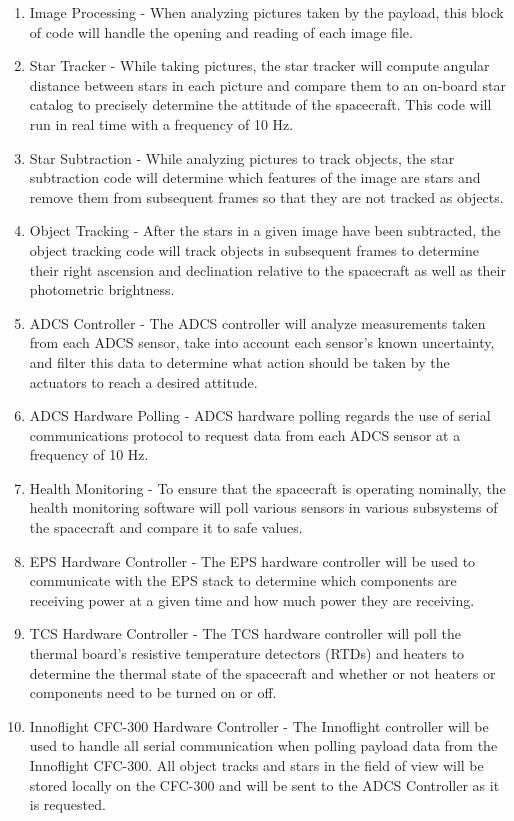 \documentclass{article}
\begin{document}
\begin{enumerate}
\item Image Processing - When analyzing pictures taken by the payload, this block of code will handle the opening and reading of each image file.
\item Star Tracker - While taking pictures, the star tracker will compute angular distance between stars in each picture and compare them to an on-board star catalog to precisely determine the attitude of the spacecraft. This code will run in real time with a frequency of 10 Hz.
\item Star Subtraction - While analyzing pictures to track objects, the star subtraction code will determine which features of the image are stars and remove them from subsequent frames so that they are not tracked as objects.
\item Object Tracking - After the stars in a given image have been subtracted, the object tracking code will track objects in subsequent frames to determine their right ascension and declination relative to the spacecraft as well as their photometric brightness.
\item ADCS Controller - The ADCS controller will analyze measurements taken from each ADCS sensor, take into account each sensor's known uncertainty, and filter this data to determine what action should be taken by the actuators to reach a desired attitude.
\item ADCS Hardware Polling - ADCS hardware polling regards the use of serial communications protocol to request data from each ADCS sensor at a frequency of 10 Hz.
\item Health Monitoring - To ensure that the spacecraft is operating nominally, the health monitoring software will poll various sensors in various subsystems of the spacecraft and compare it to safe values.
\item EPS Hardware Controller - The EPS hardware controller will be used to communicate with the EPS stack to determine which components are receiving power at a given time and how much power they are receiving.
\item TCS Hardware Controller - The TCS hardware controller will poll the thermal board's resistive temperature detectors (RTDs) and heaters to determine the thermal state of the spacecraft and whether or not heaters or components need to be turned on or off.
\item Innoflight CFC-300 Hardware Controller - The Innoflight controller will be used to handle all serial communication when polling payload data from the Innoflight CFC-300. All object tracks and stars in the field of view will be stored locally on the CFC-300 and will be sent to the ADCS Controller as it is requested.

\end{enumerate}
\end{document}

